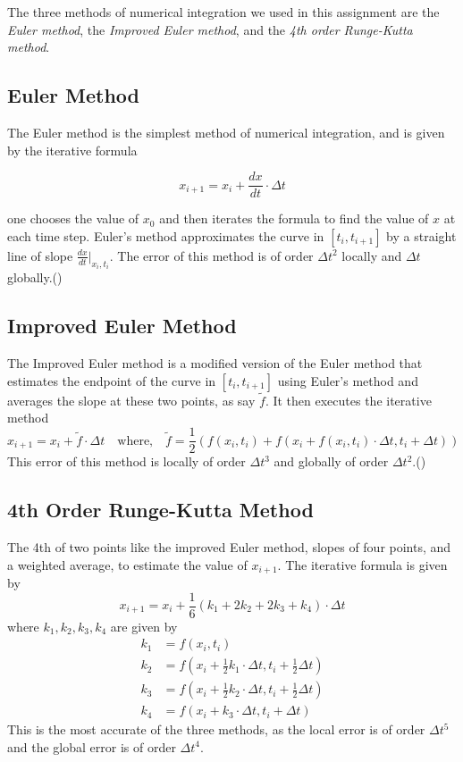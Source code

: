 \documentclass{article}
\theoremstyle{definition}
\theoremstyle{remark}
\begin{document}
\indent The three methods of numerical integration we used in this assignment are the \textit{Euler method}, the \textit{Improved Euler method}, and the \textit{4th order Runge-Kutta method}.

\subsection{Euler Method}
The Euler method is the simplest method of numerical integration, and is given by the iterative formula

\begin{equation}
    x_{i+1} = x_i + \frac{dx}{dt}\cdot \Delta t
\end{equation}

one chooses the value of $x_0$ and then iterates the formula to find the value of $x$ at each time step. Euler's method approximates the curve in $[t_i, t_{i+1}]$ by a straight line of slope $\frac{dx}{dt}|_{x_i, t_i}$. The error of this method is of order $\Delta t^2$ locally and $\Delta t$ globally.(\cite{2020Euler})\\

\subsection{Improved Euler Method}
The Improved Euler method is a modified version of the Euler method that estimates the endpoint of the curve in $[t_i, t_{i+1}]$ using Euler's method and averages the slope at these two points, as say $\tilde{f}$. It then executes the iterative method
\begin{equation}
    x_{i+1} = x_i + \tilde{f}\cdot \Delta t \quad \text{where,} \quad \tilde{f} = \frac{1}{2}\left(f(x_i, t_i) + f(x_i + f(x_i, t_i)\cdot \Delta t, t_i+\Delta t)\right)
\end{equation}
This error of this method is locally of order $\Delta t^3$ and globally of order $\Delta t^2$.(\cite{2020Improved})\\

\subsection{4th Order Runge-Kutta Method}
The 4th of two points like the improved Euler method, slopes of four points, and a weighted average, to estimate the value of $x_{i+1}$. The iterative formula is given by
\begin{equation}
    x_{i+1} = x_i + \frac{1}{6}(k_1 + 2k_2 + 2k_3 + k_4)\cdot \Delta t
\end{equation}
where $k_1, k_2, k_3, k_4$ are given by
\begin{align*}
    k_1 &= f(x_i, t_i) \\
    k_2 &= f(x_i + \frac{1}{2}k_1\cdot \Delta t, t_i + \frac{1}{2}\Delta t) \\
    k_3 &= f(x_i + \frac{1}{2}k_2\cdot \Delta t, t_i + \frac{1}{2}\Delta t) \\
    k_4 &= f(x_i + k_3\cdot \Delta t, t_i + \Delta t)
\end{align*}
This is the most accurate of the three methods, as the local error is of order $\Delta t^5$ and the global error is of order $\Delta t^4$.
\end{document}
